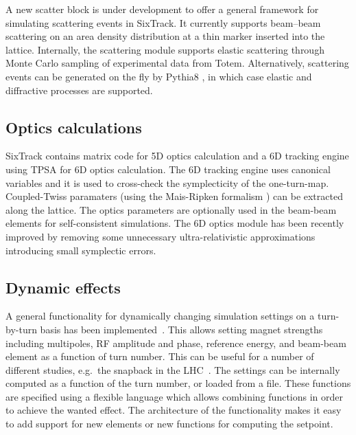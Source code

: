\documentclass[a4paper,
              ]{jacow}
\begin{document}
A new scatter block is under development to offer a general framework for simulating scattering events in SixTrack. It currently supports beam--beam scattering on an area density distribution at a thin marker inserted into the lattice.
Internally, the scattering module supports elastic scattering through Monte Carlo sampling of experimental data from Totem. Alternatively, scattering events can be generated on the fly by Pythia8 \cite{pythia8}, in which case elastic and diffractive processes are supported.

\subsection{Optics calculations}
SixTrack contains matrix code for 5D optics calculation and a 6D tracking engine using TPSA for 6D optics calculation.
The 6D tracking engine uses canonical variables and it is used to cross-check the symplecticity of the one-turn-map.
Coupled-Twiss paramaters (using the Mais-Ripken formalism \cite{maisripken}) can be extracted along the lattice.
The optics parameters are optionally used in the beam-beam elements for self-consistent simulations.
The 6D optics module has been recently improved by removing some unnecessary ultra-relativistic approximations introducing small symplectic errors.

\subsection{Dynamic effects}

A general functionality for dynamically changing simulation settings on a turn-by-turn basis has been implemented~\cite{dynk,dynk2}.
This allows setting magnet strengths including multipoles, RF amplitude and phase, reference energy, and beam-beam element as a function of turn number. This can be useful for a number of different studies, e.g.\ the snapback in the LHC~\cite{snapback_lhc}. 
The settings can be internally computed as a function of the turn number, or loaded from a file.
These functions are specified using a flexible language which allows combining functions in order to achieve the wanted effect.
The architecture of the functionality makes it easy to add support for new elements or new functions for computing the setpoint.
\end{document}
